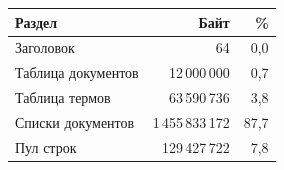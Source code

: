 \begin{tabular}{|l|r|r|}
\hline
Раздел & Байт & \% \\
\hline
Заголовок & 64 & 0,0 \\
\hline
Таблица документов & 12\,000\,000 & 0,7 \\
\hline
Таблица термов & 63\,590\,736 & 3,8 \\
\hline
Списки документов & 1\,455\,833\,172 & 87,7 \\
\hline
Пул строк & 129\,427\,722 & 7,8 \\
\hline
\end{tabular}
